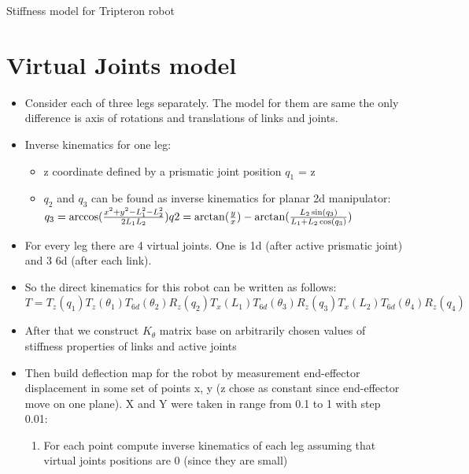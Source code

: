 \documentclass[12pt]{article}
\begin{document}
	\begin{center}
		\LARGE{Stiffness model for Tripteron robot}
	\end{center}
	\section{Virtual Joints model}
	\begin{itemize}
		\item Consider each of three legs separately. The model for them are same the only difference is axis of rotations and translations of links and joints.
		
		\item Inverse kinematics for one leg:
		\begin{itemize}
			\item z coordinate defined by a prismatic joint position $q_1$ = z
			\item $q_2$ and $q_3$ can be found as inverse kinematics for planar 2d manipulator: \\
			\begin{math}
				q_3 = \arccos(\frac{x^2 + y^2 - L_1^2 - L_2^2}{2 L_1 L_2}) \\
				q2 = \arctan(\frac{y}{x}) - \arctan(\frac{L_2 \sin(q_3)}{L_1 + L_2 \cos(q_3)})
			\end{math}
		\end{itemize}
		
		\item For every leg there are 4 virtual joints. One is 1d (after active prismatic joint) and 3 6d (after each link).
		
		\item So the direct kinematics for this robot can be written as follows: \\
		\begin{math}
			T = T_{z}(q_1)T_{z}(\theta _{1})T_{6d}(\theta _{2})R_{z}(q_2)T_{x}(L_1)T_{6d}(\theta _3)R_z(q_3)T_x(L_2)T_{6d}(\theta _4)R_z(q_4)
		\end{math}
		
		\item After that we construct $K_\theta$ matrix base on arbitrarily chosen values of stiffness properties of links and active joints
		
		\item Then build deflection map for the robot by measurement end-effector displacement in some set of points x, y (z chose as constant since end-effector move on one plane). X and Y were taken in range from 0.1 to 1 with step 0.01:
		\begin{enumerate}
			\item For each point compute inverse kinematics of each leg assuming that virtual joints positions are 0 (since they are small)
			

\end{enumerate}
\end{itemize}
\end{document}
